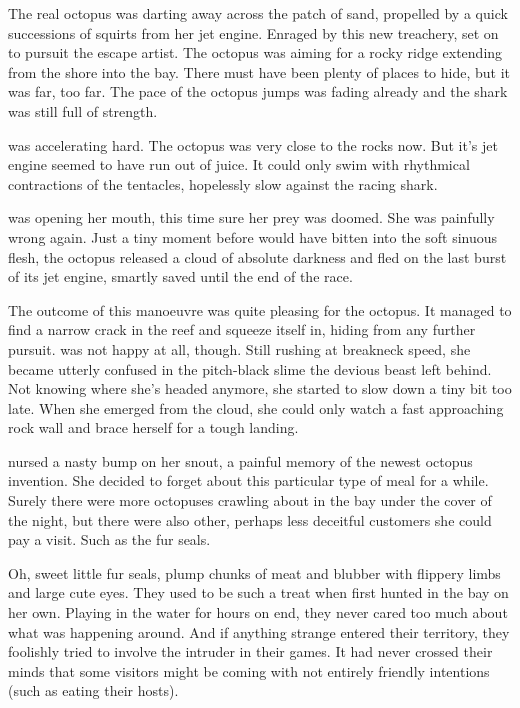 The real octopus was darting away across the patch of sand, propelled by a quick successions of squirts from her jet engine. Enraged by this new treachery, \sharknameformal set on to pursuit the escape artist. The octopus was aiming for a rocky ridge extending from the shore into the bay. There must have been plenty of places to hide, but it was far, too far. The pace of the octopus jumps was fading already and the shark was still full of strength. 

\sharknameformal was accelerating hard. The octopus was very close to the rocks now. But it's jet engine seemed to have run out of juice. It could only swim with rhythmical contractions of the tentacles, hopelessly slow against the racing shark.

\sharknameformal was opening her mouth, this time sure her prey was doomed. She was painfully wrong again. Just a tiny moment before \sharknameformal would have bitten into the soft sinuous flesh, the octopus released a cloud of absolute darkness and fled on the last burst of its jet engine, smartly saved until the end of the race.

The outcome of this manoeuvre was quite pleasing for the octopus. It managed to find a narrow crack in the reef and squeeze itself in, hiding from any further pursuit. \sharknameformal was not happy at all, though. Still rushing at breakneck speed, she became utterly confused in the pitch-black slime the devious beast left behind. Not knowing where she's headed anymore, she started to slow down a tiny bit too late. When she emerged from the cloud, she could only watch a fast approaching rock wall and brace herself for a tough landing.

\mybreak

\sharknameformal nursed a nasty bump on her snout, a painful memory of the newest octopus invention. She decided to forget about this particular type of meal for a while. Surely there were more octopuses crawling about in the bay under the cover of the night, but there were also other, perhaps less deceitful customers she could pay a visit. Such as the fur seals.

Oh, sweet little fur seals, plump chunks of meat and blubber with flippery limbs and large cute eyes. They used to be such a treat when \sharknameformal first hunted in the bay on her own. Playing in the water for hours on end, they never cared too much about what was happening around. And if anything strange entered their territory, they foolishly tried to involve the intruder in their games. It had never crossed their minds that some visitors might be coming with not entirely friendly intentions (such as eating their hosts).

